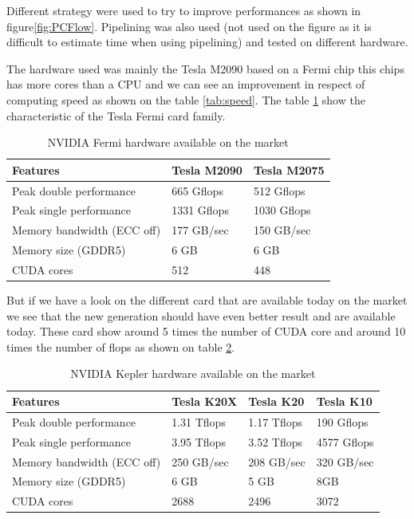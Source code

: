 Different strategy were used to try to improve performances as shown in figure\ref{fig:PCFlow}. Pipelining was also used (not used on the figure as it is difficult to estimate time when using pipelining) and tested on different hardware.

The hardware used was mainly the Tesla M2090 based on a Fermi chip this chips has more cores than a CPU and we can see an improvement in respect of computing speed as shown on the table \ref{tab:speed}. The table \ref{tab:fermi} show the characteristic of the Tesla Fermi card family.

\begin{table}[H]
	\caption{NVIDIA Fermi hardware available on the market\cite{nvidia}}
	\label{tab:fermi}
	\centering
	\begin{tabular}{|l|l|l|}
		\hline
			Features & Tesla M2090 & Tesla M2075 \\
		\hline
		\hline
			Peak double performance & 665 Gflops  & 512 Gflops \\
		\hline
			Peak single performance & 1331 Gflops & 1030 Gflops \\
		\hline
			Memory bandwidth (ECC off) & 177 GB/sec & 150 GB/sec \\
		\hline
			Memory size (GDDR5) & 6 GB & 6 GB \\
		\hline
			CUDA cores & 512 & 448 \\
		\hline
	\end{tabular}
\end{table}

But if we have a look on the different card that are available today on the market we see that the new generation should have even better result and are available today. These card show around 5 times the number of \gls{CUDA} core and around 10 times the number of \gls{flops} as shown on table \ref{tab:kepler}.

\begin{table}[H]
	\centering
	\caption{NVIDIA Kepler hardware available on the market\cite{nvidia}}
	\label{tab:kepler}
	\begin{tabular}{|l|l|l|l|}
		\hline
			Features & Tesla K20X & Tesla K20 & Tesla K10 \\
		\hline
		\hline
			Peak double performance & 1.31 Tflops & 1.17 Tflops & 190 Gflops \\
		\hline
			Peak single performance & 3.95 Tflops & 3.52 Tflops & 4577 Gflops \\
		\hline
			Memory bandwidth (ECC off) & 250 GB/sec & 208 GB/sec & 320 GB/sec \\
		\hline
			Memory size (GDDR5) & 6 GB & 5 GB & 8GB \\
		\hline
			CUDA cores & 2688 & 2496 & 3072 \\
		\hline
	\end{tabular}
\end{table}


